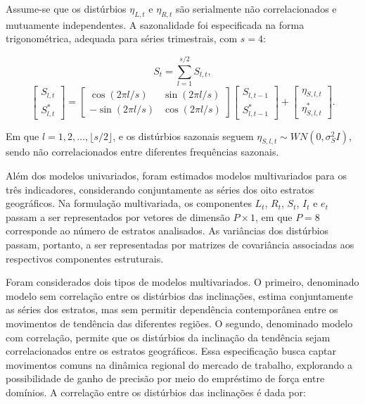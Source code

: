 \documentclass[rbe,wwwview]{econbr}
\begin{document}
Assume-se que os distúrbios \(\eta_{L,t}\) e \(\eta_{R,t}\) são serialmente não correlacionados e mutuamente independentes. A sazonalidade foi especificada na forma trigonométrica, adequada para séries trimestrais, com \(s=4\):

\begin{equation}
    S_t = \sum_{l=1}^{s/2} S_{l,t},
    \label{eq:saztrig}
\end{equation}
\begin{equation}
\label{eq:sencos}
\begin{bmatrix}
S_{l,t} \\
S_{l,t}^{*}
\end{bmatrix}
=
\begin{bmatrix}
\cos(2\pi l/s) & \sin(2\pi l/s) \\
-\sin(2\pi l/s) & \cos(2\pi l/s)
\end{bmatrix}
\begin{bmatrix}
S_{l,t-1} \\
S_{l,t-1}^{*}
\end{bmatrix}
+
\begin{bmatrix}
\eta_{S,l,t} \\
\eta_{S,l,t}^{*}
\end{bmatrix}.
\end{equation}

\noindent 
Em que \(l = 1,2,\dots,\lfloor s/2 \rfloor\), e os distúrbios sazonais seguem \(\eta_{S,l,t} \sim WN(0,\sigma_S^2I)\), sendo não correlacionados entre diferentes frequências sazonais.

Além dos modelos univariados, foram estimados modelos multivariados para os três indicadores, considerando conjuntamente as séries dos oito estratos geográficos. Na formulação multivariada, os componentes \(L_t\), \(R_t\), \(S_t\), \(I_t\) e \(e_t\) passam a ser representados por vetores de dimensão \(P \times 1\), em que \(P=8\) corresponde ao número de estratos analisados. As variâncias dos distúrbios passam, portanto, a ser representadas por matrizes de covariância associadas aos respectivos componentes estruturais.

Foram considerados dois tipos de modelos multivariados. O primeiro, denominado modelo sem correlação entre os distúrbios das inclinações, estima conjuntamente as séries dos estratos, mas sem permitir dependência contemporânea entre os movimentos de tendência das diferentes regiões. O segundo, denominado modelo com correlação, permite que os distúrbios da inclinação da tendência sejam correlacionados entre os estratos geográficos. Essa especificação busca captar movimentos comuns na dinâmica regional do mercado de trabalho, explorando a possibilidade de ganho de precisão por meio do empréstimo de força entre domínios. A correlação entre os distúrbios das inclinações é dada por:
\end{document}
